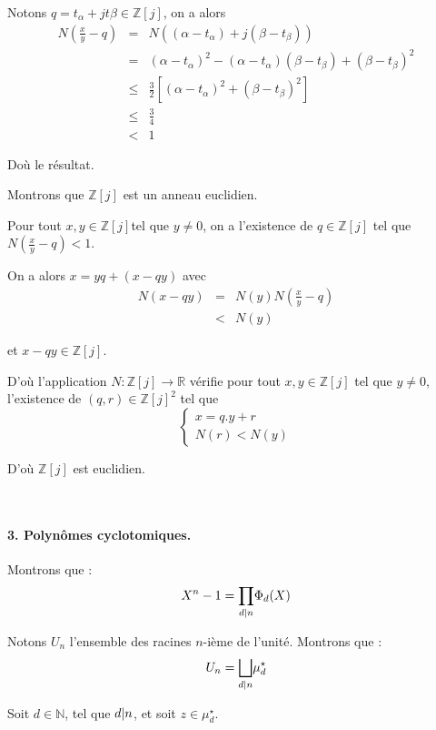 Notons $q = t_{\alpha} + j t \beta \in \mathbb{Z} [j]$, on a alors
\begin{eqnarray*}
  N \left( \frac{x}{y} - q \right) & = & N ((\alpha - t_{\alpha}) + j (\beta -
  t_{\beta}))\\
  & = & (\alpha - t_{\alpha})^2 - (\alpha - t_{\alpha}) (\beta - t_{\beta}) +
  (\beta - t_{\beta})^2\\
  & \leqslant & \frac{3}{2} [(\alpha - t_{\alpha})^2 + (\beta -
  t_{\beta})^2]\\
  & \leqslant & \frac{3}{4}\\
  & < & 1
\end{eqnarray*}


Do{\`u} le r{\'e}sultat.

Montrons que $\mathbb{Z} [j]$ est un anneau euclidien.

Pour tout $x, y \in \mathbb{Z} [j] $tel que $y \neq 0$, on a l'existence de $q
\in \mathbb{Z} [j]$ tel que $N \left( \frac{x}{y} - q \right) < 1$.

On a alors $x = y q + (x - q y)$ avec
\begin{eqnarray*}
  N (x - q y) & = & N (y) N \left( \frac{x}{y} - q \right)\\
  & < & N (y)
\end{eqnarray*}


et $x - q y \in \mathbb{Z} [j]$.

D'o{\`u} l'application $N : \mathbb{Z} [j] \rightarrow \mathbb{R}$ v{\'e}rifie
pour tout $x, y \in \mathbb{Z} [j]$ tel que $y \neq 0$, l'existence de $(q, r)
\in \mathbb{Z} [j]^2$ tel que
\[ \left\{\begin{array}{l}
     x = q.y + r\\
     N (r) < N (y)
   \end{array}\right. \]


D'o{\`u} $\mathbb{Z} [j]$ est euclidien.

\

\paragraph{3. Polyn{\^o}mes cyclotomiques. }

 Montrons que :
\[ X^n - 1 = \underset{d | n }{\prod} \Phi_d (X) \]


Notons $U_n$ l'ensemble des racines $n$-i{\`e}me de l'unit{\'e}. Montrons que
:
\[ U_n = \underset{d | n }{\bigsqcup} \mu_d^{\star} \]


Soit $d \in \mathbb{N}$, tel que $d | n $, et soit $z \in
\mu_d^{\star}$.

